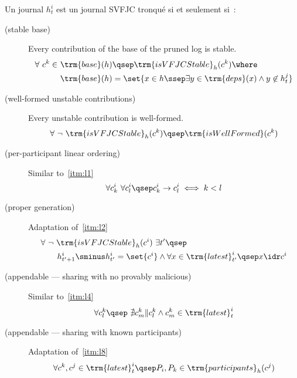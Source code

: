 \begin{definition}\label{def:svfjc-pruned-log}
Un journal $h^i_t$  est un journal \ac{SVFJC}  tronqué si et seulement si~:
\begin{description}
  \item[ (stable base)]
  Every contribution of the base of the pruned log is stable.
  \begin{align*}
  \forall\ c^k \in\ &\trm{base}(h) \qsep \trm{isVFJCStable}_h(c^k) \where\\
  &\trm{base}(h) = \set{x \in h \ssep \exists y \in \trm{deps}(x) \land y \not\in h^j_t}
  \end{align*}

  \item[ (well-formed unstable contributions)]
  Every unstable contribution is well-formed.
  \begin{equation*}
  \forall\ \neg\ \trm{isVFJCStable}_h(c^k) \qsep \trm{isWellFormed}(c^k)
  \end{equation*}

  \item[ (per-participant linear ordering)]
  Similar to~\ref{itm:l1}
  \begin{equation*}
  \forall c^i_k \ \forall c^i_l \qsep c^i_k \to c^i_l \iff k < l
  \end{equation*}

  \item[ (proper generation)]
  Adaptation of~\ref{itm:l2}
  \begin{align*}
    &\forall\ \neg\ \trm{isVFJCStable}_h(c^i)\ \exists t' \qsep\\
    &\qquad h^i_{t'+1} \sminus h^i_{t'} = \set{c^i} \land \forall x \in \trm{latest}^i_{t'} \qsep x \idr c^i
  \end{align*}

  \item[ (appendable --- sharing with no provably malicious)]
  Similar to~\ref{itm:l4}
  \begin{equation*}
  \forall c^k_l \qsep\ \nexists c^k_m \| c^k_l \land c^k_m \in \trm{latest}^i_t
  \end{equation*}

    \item[ (appendable --- sharing with known participants)] Adaptation of~\ref{itm:l8}
  \begin{equation*}
  \forall c^k, c^j \in \trm{latest}^i_t \qsep P_i, P_k \in \trm{participants}_h(c^j)
  \end{equation*}
\end{description}
\end{definition}

